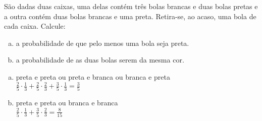 \begin{ex}
São dadas duas caixas, uma delas contém três bolas brancas e duas bolas pretas e a outra contém duas bolas brancas e uma preta. Retira-se, ao acaso, uma bola de cada caixa. Calcule:
   \begin{enumerate}[(a)]
   \item a probabilidade de que pelo menos uma bola seja preta.
   \item a probabilidade de as duas bolas serem da mesma cor.
   \end{enumerate}
     \begin{sol}
       \phantom{A} 
       \begin{enumerate} [(a)]
           \item preta e preta ou preta e branca ou branca e preta \\
           $\frac{2}{5}\cdot\frac{1}{3}+\frac{2}{5}\cdot\frac{2}{3}+\frac{3}{5}\cdot\frac{1}{3}=\frac{3}{5}$
           \item preta e preta ou branca e branca \\
           $\frac{2}{5}\cdot\frac{1}{3}+\frac{3}{5}\cdot\frac{2}{3}=\frac{8}{15}$
       \end{enumerate}
     \end{sol}
\end{ex}